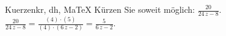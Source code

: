 \begin{MAufgabe}{Kuerzen}{kr, dh, MaTeX}
K\"urzen Sie soweit m\"oglich: $\frac{20}{24\, z - 8}$.\\ 
\ifLsg\MLoesung
\quad $\frac{20}{24\, z - 8}=\frac{(4)\cdot(5)}{(4)\cdot(6\, z - 2)}=\frac{5}{6\, z - 2}$.\else\relax\fi
 \end{MAufgabe}